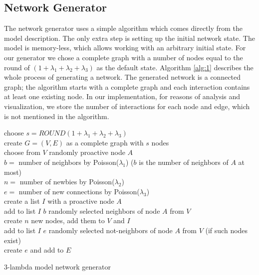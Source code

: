 \subsection{Network Generator}
\label{sec:alg}
The network generator uses a simple algorithm which comes directly from the model description. The only extra step is setting up the initial network state. The model is memory-less, which allows working with an arbitrary initial state. For our generator we chose a complete graph with a number of nodes equal to the round of $(1 + \lambda_1 + \lambda_2 + \lambda_3)$ as the default state. Algorithm \ref{alg:1} describes the whole process of generating a network. The generated network is a connected graph; the algorithm starts with a complete graph and each interaction contains at least one existing node. In our implementation, for reasons of analysis and visualization, we store the number of interactions for each node and edge, which is not mentioned in the algorithm.

\begin{algorithm}
\SetAlgoLined
choose $s = ROUND(1 + \lambda_1 + \lambda_2 + \lambda_3)$\\
create $G = (V, E)$  as a complete graph with $s$ nodes\\

{ 
  choose from $V$ randomly proactive node $A$ \\
  $b =$ number of neighbors by Poisson($\lambda_1$) ($b$ is the number of neighbors of $A$ at most) \\
  $n =$ number of newbies by Poisson($\lambda_2$)\\
  $e =$ number of new connections by Poisson($\lambda_3$)\\

  create a list $I$ with a proactive node $A$\\
  add to list $I$ $b$ randomly selected neighbors of node $A$ from $V$\\
  create $n$ new nodes, add them to $V$ and $I$\\
  add to list $I$ $e$ randomly selected not-neighbors of node $A$ from $V$ (if such nodes exist)\\

 {
    {
      create $e$ and add to $E$\\
    }
 }
}

\caption{3-lambda model network generator}\label{alg:1}
\end{algorithm}


